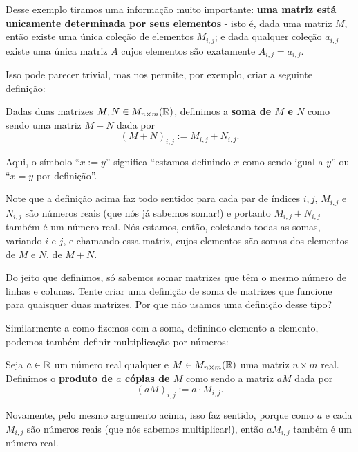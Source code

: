 Desse exemplo tiramos uma informação muito importante: \textbf{uma matriz está unicamente determinada por seus elementos} - isto é, dada uma matriz $M$, então existe uma única coleção de elementos $M_{i,j}$; e dada qualquer coleção $a_{i,j}$ existe uma única matriz $A$ cujos elementos são exatamente $A_{i,j}=a_{i,j}$.

Isso pode parecer trivial, mas nos permite, por exemplo, criar a seguinte definição:

\begin{df}
	Dadas duas matrizes $M,N\in M_{n\times m}(\mathbb R)$, definimos a \textbf{soma de $M$ e $N$} como sendo uma matriz $M+N$ dada por
	\[(M+N)_{i,j}:= M_{i,j}+N_{i,j}.\]
\end{df}
\begin{rmk}
	Aqui, o símbolo ``$x:=y$'' significa ``estamos definindo $x$ como sendo igual a $y$'' ou ``$x=y$ por definição''.
\end{rmk}
\begin{rmk}
	Note que a definição acima faz todo sentido: para cada par de índices $i,j$, $M_{i,j}$ e $N_{i,j}$ são números reais (que nós já sabemos somar!) e portanto $M_{i,j}+N_{i,j}$ também é um número real. Nós estamos, então, coletando todas as somas, variando $i$ e $j$, e chamando essa matriz, cujos elementos são somas dos elementos de $M$ e $N$, de $M+N$.
\end{rmk}
\begin{exerc}
	Do jeito que definimos, só sabemos somar matrizes que têm o mesmo número de linhas e colunas. Tente criar uma definição de soma de matrizes que funcione para quaisquer duas matrizes. Por que não usamos uma definição desse tipo?
\end{exerc}

Similarmente a como fizemos com a soma, definindo elemento a elemento, podemos também definir multiplicação por números:

\begin{df}
	Seja $a\in \mathbb R$ um número real qualquer e $M\in M_{n\times m}(\mathbb R)$ uma matriz $n\times m$ real. Definimos o \textbf{produto de $a$ cópias de $M$} como sendo a matriz $aM$ dada por
	\[(aM)_{i,j}:=a\cdot M_{i,j}.\]
\end{df}

Novamente, pelo mesmo argumento acima, isso faz sentido, porque como $a$ e cada $M_{i,j}$ são números reais (que nós sabemos multiplicar!), então $aM_{i,j}$ também é um número real.

